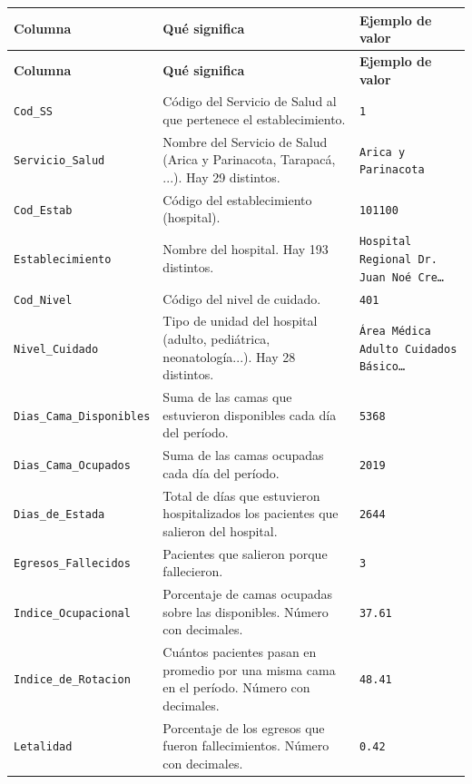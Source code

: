 \documentclass[10.5pt]{article}
\newcommand{\hdr}[1]{\textbf{\color{white}#1}}
\begin{document}
\begin{xltabular}{\linewidth}{@{}p{4.5cm} >{\raggedright\arraybackslash}X p{3.4cm}@{}}
\hdr{Columna} & \hdr{Qué significa} & \hdr{Ejemplo de valor} \\
\endfirsthead
{}\hdr{Columna} & \hdr{Qué significa} & \hdr{Ejemplo de valor} \\
\endhead
\texttt{Cod\_\allowbreak{}SS} & Código del Servicio de Salud al que pertenece el establecimiento. & \texttt{1} \\
\texttt{Servicio\_\allowbreak{}Salud} & Nombre del Servicio de Salud (Arica y Parinacota, Tarapacá, ...). Hay 29 distintos. & \texttt{Arica y Parinacota} \\
\texttt{Cod\_\allowbreak{}Estab} & Código del establecimiento (hospital). & \texttt{101100} \\
\texttt{Establecimiento} & Nombre del hospital. Hay 193 distintos. & \texttt{Hospital Regional Dr. Juan Noé Cre…} \\
\texttt{Cod\_\allowbreak{}Nivel} & Código del nivel de cuidado. & \texttt{401} \\
\texttt{Nivel\_\allowbreak{}Cuidado} & Tipo de unidad del hospital (adulto, pediátrica, neonatología...). Hay 28 distintos. & \texttt{Área Médica Adulto Cuidados Básico…} \\
\texttt{Dias\_\allowbreak{}Cama\_\allowbreak{}Disponibles} & Suma de las camas que estuvieron disponibles cada día del período. & \texttt{5368} \\
\texttt{Dias\_\allowbreak{}Cama\_\allowbreak{}Ocupados} & Suma de las camas ocupadas cada día del período. & \texttt{2019} \\
\texttt{Dias\_\allowbreak{}de\_\allowbreak{}Estada} & Total de días que estuvieron hospitalizados los pacientes que salieron del hospital. & \texttt{2644} \\
\texttt{Egresos\_\allowbreak{}Fallecidos} & Pacientes que salieron porque fallecieron. & \texttt{3} \\
\texttt{Indice\_\allowbreak{}Ocupacional} & Porcentaje de camas ocupadas sobre las disponibles. Número con decimales. & \texttt{37.61} \\
\texttt{Indice\_\allowbreak{}de\_\allowbreak{}Rotacion} & Cuántos pacientes pasan en promedio por una misma cama en el período. Número con decimales. & \texttt{48.41} \\
\texttt{Letalidad} & Porcentaje de los egresos que fueron fallecimientos. Número con decimales. & \texttt{0.42} \\

\end{xltabular}
\end{document}
